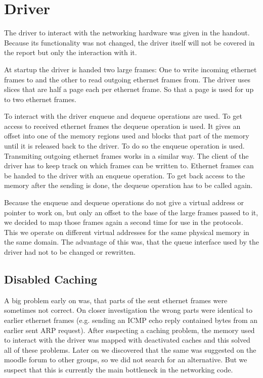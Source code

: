 \section{Driver}

The driver to interact with the networking hardware was given in the handout. Because its functionality was not changed, the driver itself will not be covered in the report but only the interaction with it.

At startup the driver is handed two large frames: One to write incoming ethernet frames to and the other to read outgoing ethernet frames from. The driver uses slices that are half a page each per ethernet frame. So that a page is used for up to two ethernet frames.

To interact with the driver enqueue and dequeue operations are used. To get access to received ethernet frames the dequeue operation is used. It gives an offset into one of the memory regions used and blocks that part of the memory until it is released back to the driver. To do so the enqueue operation is used. Transmiting outgoing ethernet frames works in a similar way. The client of the driver has to keep track on which frames can be written to. Ethernet frames can be handed to the driver with an enqueue operation. To get back access to the memory after the sending is done, the dequeue operation has to be called again.

Because the enqueue and dequeue operations do not give a virtual address or pointer to work on, but only an offset to the base of the large frames passed to it, we decided to map those frames again a second time for use in the protocols. This we operate on different virtual addresses for the same physical memory in the same domain. The advantage of this was, that the queue interface used by the driver had not to be changed or rewritten.

\subsection{Disabled Caching}
A big problem early on was, that parts of the sent ethernet frames were sometimes not correct. On closer investigation the wrong parts were identical to earlier ethernet frames (e.g. sending an ICMP echo reply contained bytes from an earlier sent ARP request). After suspecting a caching problem, the memory used to interact with the driver was mapped with deactivated caches and this solved all of these problems. Later on we discovered that the same was suggested on the moodle forum to other groups, so we did not search for an alternative. But we suspect that this is currently the main bottleneck in the networking code.

